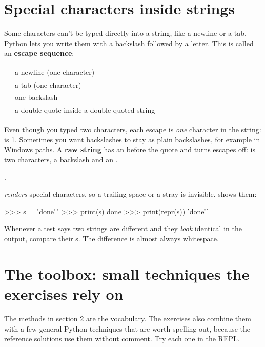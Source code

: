 \documentclass[10pt,a4paper]{article}
\begin{document}
\section{Special characters inside strings}
Some characters can’t be typed directly into a string, like a newline or a tab. Python lets you write them with a backslash followed by a letter. This is called an \textbf{escape sequence}:
\begin{datatable}{}{\small}
\begin{xltabular}{\linewidth}{@{}Y{0.42}Y{1.58}@{}}
 &  \\ \hline
\endhead
{} & a newline (one character) \\
 & a tab (one character) \\
\code{\textquotedbl{}\textbackslash{}\textbackslash{}\textquotedbl{}} & one backslash \\
\code{\textquotedbl{}\textbackslash{}\textquotedbl{}\textquotedbl{}} & a double quote inside a double-quoted string \\
\hline
\end{xltabular}
\end{datatable}
Even though you typed two characters, each escape is \emph{one} character in the string:  is 1.
Sometimes you want backslashes to stay as plain backslashes, for example in Windows paths. A \textbf{raw string} has an  before the quote and turns escapes off:  is two characters, a backslash and an .
\begin{tipbox}
.
\end{tipbox}
 \emph{renders} special characters, so a trailing space or a stray  is invisible.  shows them:
\begin{txtcode}
>>> s = "done \r\n"
>>> print(s)
done
>>> print(repr(s))
'done \r\n'
\end{txtcode}
Whenever a test says two strings are different and they \emph{look} identical in the output, compare their s. The difference is almost always whitespace.
\setcounter{section}{7}
\section{The toolbox: small techniques the exercises rely on}
The methods in section 2 are the vocabulary. The exercises also combine them with a few general Python techniques that are worth spelling out, because the reference solutions use them without comment. Try each one in the REPL.
\end{document}
